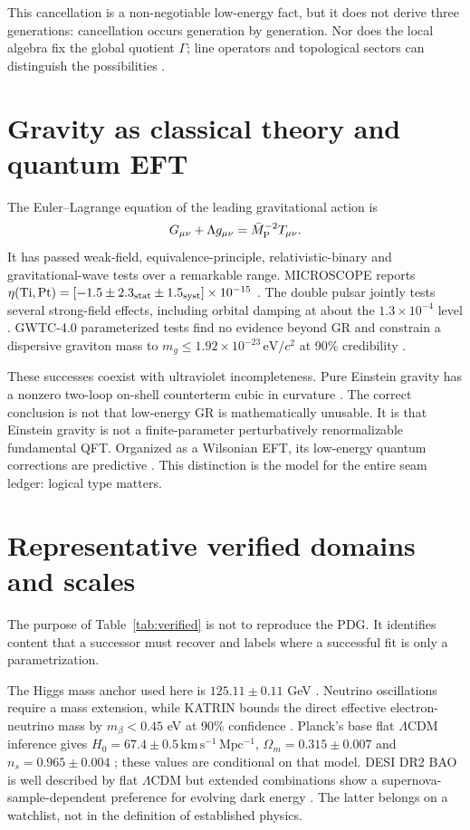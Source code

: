 \documentclass[11pt,a4paper]{article}
\newcommand{\Mpl}{\bar M_{\rm P}}
\begin{document}
This cancellation is a non-negotiable low-energy fact, but it does not derive three generations: cancellation occurs generation by generation. Nor does the local algebra fix the global quotient $\Gamma$; line operators and topological sectors can distinguish the possibilities \cite{Tong2017,Hsin2024}.

\section{Gravity as classical theory and quantum EFT}
The Euler--Lagrange equation of the leading gravitational action is
\begin{equation}
G_{\mu\nu}+\Lambda g_{\mu\nu}=\Mpl^{-2}T_{\mu\nu}.
\end{equation}
It has passed weak-field, equivalence-principle, relativistic-binary and gravitational-wave tests over a remarkable range. MICROSCOPE reports $\eta({\rm Ti,Pt})=[-1.5\pm2.3_{\rm stat}\pm1.5_{\rm syst}]\times10^{-15}$ \cite{MICROSCOPE2022}. The double pulsar jointly tests several strong-field effects, including orbital damping at about the $1.3\times10^{-4}$ level \cite{DoublePulsar2021}. GWTC-4.0 parameterized tests find no evidence beyond GR and constrain a dispersive graviton mass to $m_g\le1.92\times10^{-23}\,\mathrm{eV}/c^2$ at 90\% credibility \cite{GWTC4GR2026}.

These successes coexist with ultraviolet incompleteness. Pure Einstein gravity has a nonzero two-loop on-shell counterterm cubic in curvature \cite{GoroffSagnotti1986}. The correct conclusion is not that low-energy GR is mathematically unusable. It is that Einstein gravity is not a finite-parameter perturbatively renormalizable fundamental QFT. Organized as a Wilsonian EFT, its low-energy quantum corrections are predictive \cite{Donoghue1994}. This distinction is the model for the entire seam ledger: logical type matters.

\section{Representative verified domains and scales}
The purpose of Table~\ref{tab:verified} is not to reproduce the PDG. It identifies content that a successor must recover and labels where a successful fit is only a parametrization.



The Higgs mass anchor used here is $125.11\pm0.11$ GeV \cite{ATLASHiggs2023}. Neutrino oscillations require a mass extension, while KATRIN bounds the direct effective electron-neutrino mass by $m_\beta<0.45$ eV at 90\% confidence \cite{KATRIN2025}. Planck's base flat $\Lambda$CDM inference gives $H_0=67.4\pm0.5\,\mathrm{km\,s^{-1}\,Mpc^{-1}}$, $\Omega_m=0.315\pm0.007$ and $n_s=0.965\pm0.004$ \cite{Planck2018}; these values are conditional on that model. DESI DR2 BAO is well described by flat $\Lambda$CDM but extended combinations show a supernova-sample-dependent preference for evolving dark energy \cite{DESIDR22025}. The latter belongs on a watchlist, not in the definition of established physics.
\end{document}

